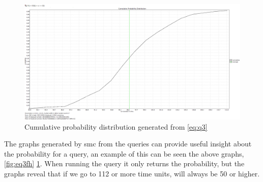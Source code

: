 \begin{figure}[!h]
	\includegraphics[width=\textwidth]{graphics/eq3cpd.png}
	\caption{Cumulative probability distribution generated from \cref{eq:q3}}
	\label{fig:eq3cpd}
\end{figure}

The graphs generated by \gls{smc} from the queries can provide useful insight about the probability for a query, an example of this can be seen the above graphs, \cref{fig:eq3fh} \cref{fig:eq3cpd}. 
When running the query it only returns the probability, but the graphs reveal that if we go to 112 or more time units,  will always be 50 or higher.
